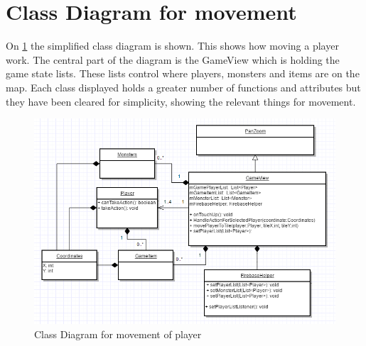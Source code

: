 \section{Class Diagram for movement}

On \ref{ClassDiagramMovement} the simplified class diagram is shown. This shows how moving a player work. The central part of the diagram is the GameView which is holding the game state lists. These lists control where players, monsters and items are on the map. Each class displayed holds a greater number of functions and attributes but they have been cleared for simplicity, showing the relevant things for movement.


\begin{figure}
	\centering
	\includegraphics[width=130mm]{images/ClassDiagramMovement.PNG}
	\caption{Class Diagram for movement of player \label{ClassDiagramMovement}}
\end{figure}